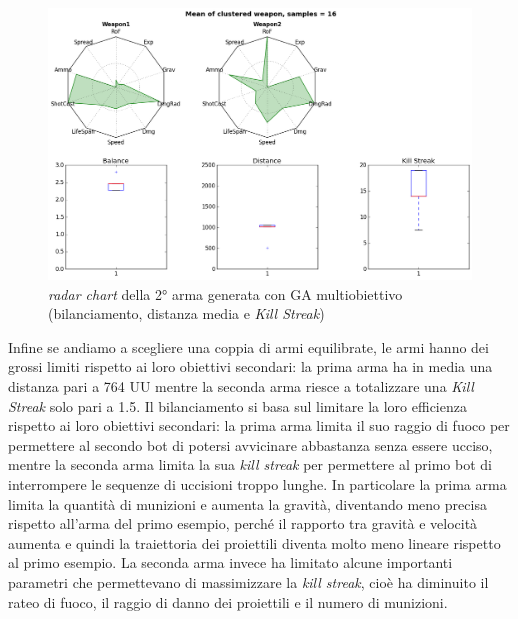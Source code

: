 \documentclass[12pt, italian]{toptesi}
\begin{document}
\begin{figure}[tp]
\centering
\includegraphics[width=1.0\textwidth]{rad_dist_kill_2}
\caption{\emph{radar chart} della 2°  arma generata con GA multiobiettivo (bilanciamento, distanza media e \emph{Kill Streak})}
\label{fig:rad_dist_kill_2}
\end{figure}
Infine se andiamo a scegliere una coppia di armi equilibrate, le armi hanno dei grossi limiti rispetto ai loro obiettivi secondari: la prima arma ha in media una distanza pari a 764 UU mentre la seconda arma riesce a totalizzare una \emph{Kill Streak} solo pari a 1.5. Il bilanciamento si basa sul limitare la loro efficienza rispetto ai loro obiettivi secondari: la prima arma limita il suo raggio di fuoco per permettere al secondo bot di potersi avvicinare abbastanza senza essere ucciso, mentre la seconda arma limita la sua \emph{kill streak} per permettere al primo bot di interrompere le sequenze di uccisioni troppo lunghe.
In particolare la prima arma limita la quantità di munizioni e aumenta la gravità, diventando meno precisa rispetto all'arma del primo esempio, perché il rapporto tra gravità e velocità aumenta e quindi la traiettoria dei proiettili diventa molto meno lineare rispetto al primo esempio. La seconda arma invece ha limitato alcune importanti parametri che permettevano di massimizzare la \emph{kill streak}, cioè ha diminuito il rateo di fuoco, il raggio di danno dei proiettili e il numero di munizioni.
\end{document}
